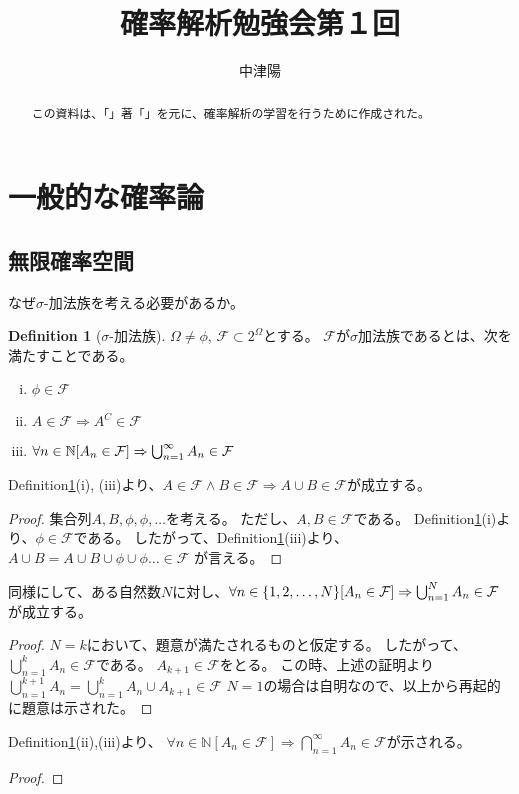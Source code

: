 \documentclass[dvipdfmx]{article}
\title{確率解析勉強会第１回}
\author{中津陽}
\theoremstyle{definition}
\newtheorem{dfn}{Definition}[subsection]
\begin{document}
\maketitle

\begin{abstract}
 この資料は、「」著「」を元に、確率解析の学習を行うために作成された。
\end{abstract}

\section{一般的な確率論}
\subsection{無限確率空間}
 なぜ$\sigma$-加法族を考える必要があるか。 

\begin{dfn}[$\sigma$-加法族]
    \label{dfn:sigma-alg}
    $\Omega \neq \phi$, $\mathcal{F} \subset 2^{\Omega}$とする。
    $\mathcal{F}$が$\sigma$加法族であるとは、次を満たすことである。
    \begin{enumerate}[(i)]
        \item $\phi \in \mathcal{F}$
        \item $A \in \mathcal{F} \Rightarrow A^{C} \in \mathcal{F}$ 
        \item 
            $
            \forall n \in \mathbb{N} \qty[ A_n \in \mathcal{F} ] \Rightarrow \bigcup_{n=1}^{\infty} A_n \in \mathcal{F}
            $
    \end{enumerate}
\end{dfn}

Definition\ref{dfn:sigma-alg}(i), (iii)より、$A \in \mathcal{F} \land B \in \mathcal{F} \Rightarrow A \cup B \in \mathcal{F}$が成立する。
\begin{proof}
    集合列$A, B, \phi, \phi, \dots$を考える。
    ただし、$A, B \in \mathcal{F}$である。
    Definition\ref{dfn:sigma-alg}(i)より、$\phi \in \mathcal{F}$である。
    したがって、Definition\ref{dfn:sigma-alg}(iii)より、
    $A \cup B = A \cup B \cup \phi \cup \phi \dots \in \mathcal{F}$
    が言える。
\end{proof}

同様にして、ある自然数$N$に対し、$\forall n \in \{1,2,\dots,N \} \qty[A_n \in \mathcal{F}] \Rightarrow \bigcup_{n=1}^{N} A_n \in \mathcal{F}$が成立する。
\begin{proof}
    $N=k$において、題意が満たされるものと仮定する。
    したがって、$\bigcup_{n=1}^{k}A_n \in \mathcal{F}$である。
    $A_{k+1} \in \mathcal{F}$をとる。
    この時、上述の証明より$\bigcup_{n=1}^{k+1}A_n = \bigcup_{n=1}^{k}A_n \cup A_{k+1} \in \mathcal{F}$
    $N=1$の場合は自明なので、以上から再起的に題意は示された。
\end{proof}

Definition\ref{dfn:sigma-alg}(ii),(iii)より、
$\forall n \in \mathbb{N} [A_n \in \mathcal{F}] \Rightarrow \bigcap_{n=1}^{\infty} A_n \in \mathcal{F}$が示される。
\begin{proof}
    
\end{proof}
\end{document}
